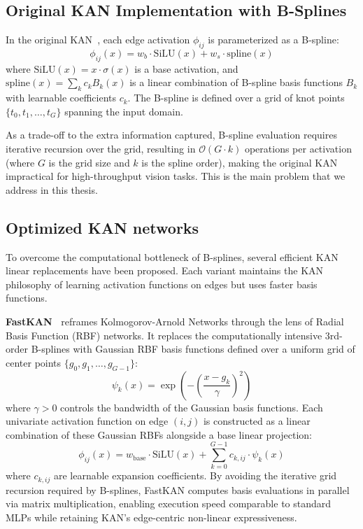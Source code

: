 \documentclass[a4paper]{report}
\begin{document}
\subsection{Original KAN Implementation with B-Splines}
In the original KAN~\cite{liu2024kan}, each edge activation $\phi_{ij}$ is parameterized as a B-spline:
\begin{equation}
    \phi_{ij}(x) = w_b \cdot \text{SiLU}(x) + w_s \cdot \text{spline}(x)
\end{equation}
where $\text{SiLU}(x) = x \cdot \sigma(x)$ is a base activation, and $\text{spline}(x) = \sum_k c_k B_k(x)$ is a linear combination of B-spline basis functions $B_k$ with learnable coefficients $c_k$. The B-spline is defined over a grid of knot points $\{t_0, t_1, \dots, t_G\}$ spanning the input domain.

As a trade-off to the extra information captured, B-spline evaluation requires iterative recursion over the grid, resulting in $\mathcal{O}(G \cdot k)$ operations per activation (where $G$ is the grid size and $k$ is the spline order), making the original KAN impractical for high-throughput vision tasks. This is the main problem that we address in this thesis.


\label{sec:kan_variants}
\subsection{Optimized KAN networks}
To overcome the computational bottleneck of B-splines, several efficient KAN linear replacements have been proposed. Each variant maintains the KAN philosophy of learning activation functions on edges but uses faster basis functions.

\textbf{FastKAN~\cite{li2024fastkan}} reframes Kolmogorov-Arnold Networks through the lens of Radial Basis Function (RBF) networks. It replaces the computationally intensive 3rd-order B-splines with Gaussian RBF basis functions defined over a uniform grid of center points $\{g_0, g_1, \dots, g_{G-1}\}$:
\begin{equation}
    \psi_k(x) = \exp\left( -\left(\frac{x - g_k}{\gamma}\right)^2 \right)
\end{equation}
where $\gamma > 0$ controls the bandwidth of the Gaussian basis functions. Each univariate activation function on edge $(i, j)$ is constructed as a linear combination of these Gaussian RBFs alongside a base linear projection:
\begin{equation}
    \phi_{ij}(x) = w_{\text{base}} \cdot \text{SiLU}(x) + \sum_{k=0}^{G-1} c_{k,ij} \cdot \psi_k(x)
\end{equation}
where $c_{k,ij}$ are learnable expansion coefficients. By avoiding the iterative grid recursion required by B-splines, FastKAN computes basis evaluations in parallel via matrix multiplication, enabling execution speed comparable to standard MLPs while retaining KAN's edge-centric non-linear expressiveness.
\end{document}
